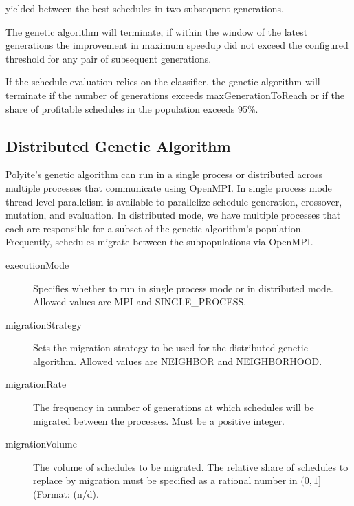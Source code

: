 \documentclass{article}
\begin{document}
\begin{description}
\begin{itemize}
\begin{description}
          yielded between the best schedules in two subsequent generations.
      \end{description}
        The genetic algorithm will terminate, if within the window of the latest
        generations the improvement in maximum speedup did not exceed the
        configured threshold for any pair of subsequent generations.
  \end{itemize}
  If the schedule evaluation relies on the classifier, the genetic algorithm
  will terminate if the number of generations exceeds
  \textsf{maxGenerationToReach} or if the share of profitable schedules in the
  population exceeds 95\%.
\end{description}

\subsection{Distributed Genetic Algorithm}
Polyite's genetic algorithm can run in a single process or distributed across
multiple processes that communicate using OpenMPI. In single process mode
thread-level parallelism is available to parallelize schedule generation,
crossover, mutation, and evaluation. In distributed mode, we have multiple
processes that each are responsible for a subset of the genetic algorithm's
population. Frequently, schedules migrate between the subpopulations via
OpenMPI.
\begin{description}
  \item[executionMode] Specifies whether to run in single process mode or in
    distributed mode. Allowed values are MPI and SINGLE\_PROCESS.
  \item[migrationStrategy] Sets the migration strategy to be used for the
    distributed genetic algorithm. Allowed values are NEIGHBOR and NEIGHBORHOOD.
  \item[migrationRate] The frequency in number of generations at which
    schedules will be migrated between the processes. Must be a positive
    integer.
  \item[migrationVolume] The volume of schedules to be migrated. The relative
    share of schedules to replace by migration must be specified as a rational
    number in $(0, 1]$ (Format: (n/d).
\end{description}
\end{document}

